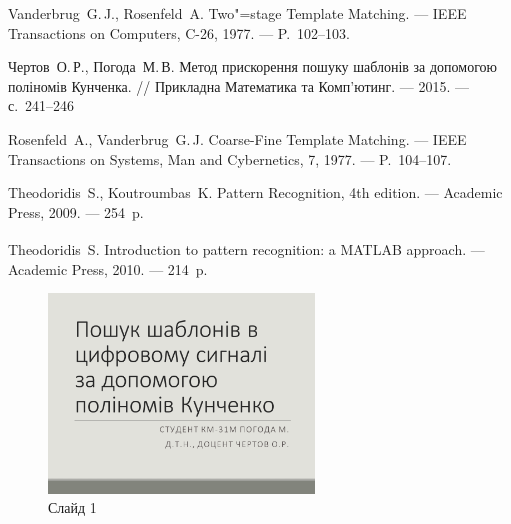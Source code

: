 \documentclass{thesis_utf8}
\begin{document}
\begin{thebibliography}
    Vanderbrug~G.\,J., Rosenfeld~A. Two"=stage Template Matching. --- IEEE Transactions on Computers, C-26, 1977. ---
    P.~102--103.

    Чертов~О.\,Р., Погода~М.\,В. Метод прискорення пошуку шаблонів за допомогою поліномів Кунченка. // Прикладна
    Математика та Комп’ютинг. --- 2015. — с.~241--246

    Rosenfeld~A., Vanderbrug~G.\,J. Coarse-Fine Template Matching. --- IEEE Transactions on Systems, Man and
    Cybernetics, 7, 1977. --- P.~104--107.

    Theodoridis~S., Koutroumbas~K. Pattern Recognition, 4th edition. --- Academic Press, 2009. --- 254~p.

    Theodoridis~S. Introduction to pattern recognition: a MATLAB\textsuperscript{\textregistered} approach. ---
    Academic Press, 2010. --- 214~p.
\end{thebibliography}








\begin{figure}[h]
    \centering
    \includegraphics[width=0.63\textwidth]{slides/slide01.png}
    \caption{Слайд 1}
\end{figure}
\end{document}
